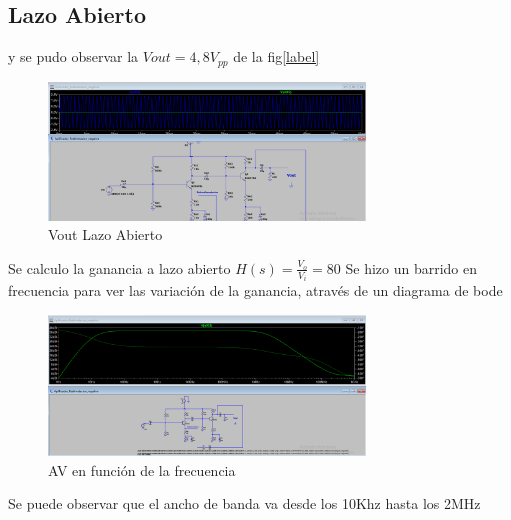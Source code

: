 \documentclass[12pt, letterpaper]{article}
\begin{document}
\subsection{Lazo Abierto}
y se pudo observar la $Vout=4,8V_{pp}$ de la fig\ref*{label}
\begin{figure}[h!]
	\centering
	\includegraphics[width=0.75\textwidth]{Imagenes/Av.png}
	\caption{Vout Lazo Abierto}
	\label{fig:4}
\end{figure}
Se calculo la ganancia a lazo abierto $H(s)=\frac{V_o}{V_i} = 80$
\singlespacing
Se hizo un barrido en frecuencia para ver las variación de la ganancia, através de un diagrama de bode 
\begin{figure}[h!]
	\centering
	\includegraphics[width=0.75\textwidth]{Imagenes/lazoAbierto.png}
	\caption{AV en función de la frecuencia}
	\label{fig:4}
\end{figure}
Se puede observar que el ancho de banda va desde los 10Khz hasta los 2MHz
\end{document}
